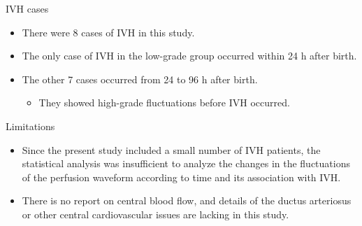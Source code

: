 \documentclass{beamer}
\begin{document}
\begin{frame}{IVH cases}
    \begin{itemize}
        \item There were 8 cases of IVH in this study.
        \item The only case of IVH in the low-grade group occurred within 24 h
            after birth.
        \item The other 7 cases occurred from 24 to 96 h after birth.
            \begin{itemize}
                \item They showed high-grade fluctuations before IVH occurred.
            \end{itemize}
    \end{itemize}
\end{frame}

\begin{frame}{Limitations}
    \begin{itemize}
        \item Since the present study included a small number of IVH patients,
            the statistical analysis was insufficient to analyze the changes in
            the fluctuations of the perfusion waveform according to time and
            its association with IVH.
        \item There is no report on central blood flow, and details of the
            ductus arteriosus or other central cardiovascular issues are
            lacking in this study.
    \end{itemize}
\end{frame}
\end{document}

